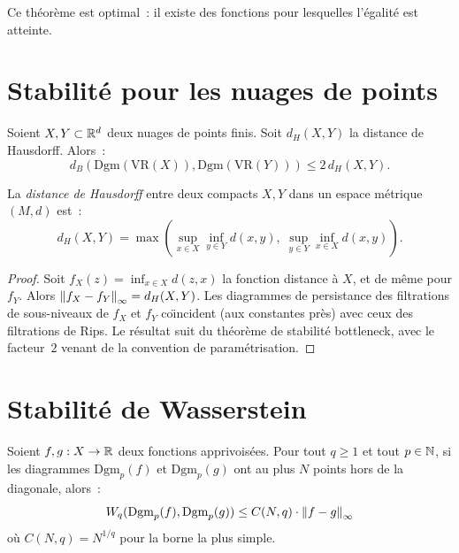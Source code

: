 \begin{remarque}
Ce th\'eor\`eme est optimal~: il existe des fonctions pour lesquelles
l'\'egalit\'e est atteinte.
\end{remarque}

\section{Stabilit\'e pour les nuages de points}

\begin{corollaire}
Soient $X, Y \subset \mathbb{R}^d$ deux nuages de points finis. Soit
$d_H(X, Y)$ la distance de Hausdorff. Alors~:
\[
  d_B(\mathrm{Dgm}(\mathrm{VR}(X)), \mathrm{Dgm}(\mathrm{VR}(Y)))
  \leq 2\, d_H(X, Y).
\]
\end{corollaire}

\begin{definition}
La \emph{distance de Hausdorff} entre deux compacts $X, Y$ dans un
espace m\'etrique $(M, d)$ est~:
\[
  d_H(X, Y) = \max\left(
    \sup_{x \in X} \inf_{y \in Y} d(x, y),\;
    \sup_{y \in Y} \inf_{x \in X} d(x, y)
  \right).
\]
\end{definition}

\begin{proof}
Soit $f_X(z) = \inf_{x \in X} d(z, x)$ la fonction distance \`a $X$,
et de m\^eme pour $f_Y$. Alors
$\left\| f_X - f_Y \right\|_\infty = d_H(X, Y)$.
Les diagrammes de persistance des filtrations de sous-niveaux de $f_X$
et $f_Y$ co\"{\i}ncident (aux constantes pr\`es) avec ceux des
filtrations de Rips. Le r\'esultat suit du th\'eor\`eme de stabilit\'e
bottleneck, avec le facteur~$2$ venant de la convention de param\'etrisation.
\end{proof}

\section{Stabilit\'e de Wasserstein}

\begin{theoreme}
Soient $f, g : X \to \mathbb{R}$ deux fonctions apprivois\'ees.
Pour tout $q \geq 1$ et tout $p \in \mathbb{N}$, si les diagrammes $\mathrm{Dgm}_p(f)$
et $\mathrm{Dgm}_p(g)$ ont au plus $N$ points hors de la diagonale, alors~:
\[
  W_q(\mathrm{Dgm}_p(f), \mathrm{Dgm}_p(g))
  \leq C(N, q) \cdot \left\| f - g \right\|_\infty
\]
o\`u $C(N, q) = N^{1/q}$ pour la borne la plus simple.
\end{theoreme}

